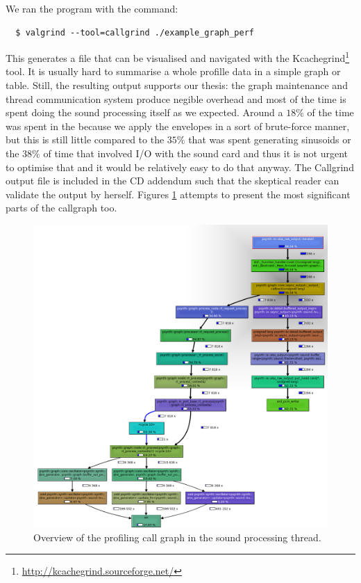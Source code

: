 We ran the program with the command:
\begin{verbatim}
  $ valgrind --tool=callgrind ./example_graph_perf
\end{verbatim}

This generates a  file that can be
visualised and navigated with the
Kcachegrind\footnote{\url{http://kcachegrind.sourceforge.net/}}
tool. It is usually hard to summarise a whole profille data in a
simple graph or table. Still, the resulting output supports our
thesis: the graph maintenance and thread communication system produce
negible overhead and most of the time is spent doing the sound
processing itself as we expected. Around a $18\%$ of the time was
spent in the  because we apply the envelopes
in a sort of brute-force manner, but this is still little compared to
the $35\%$ that was spent generating sinusoids or the $38\%$ of time
that involved I/O with the sound card and thus it is not urgent to
optimise that and it would be relatively easy to do that anyway. The
Callgrind output file is included in the CD addendum such that the
skeptical reader can validate the output by herself. Figures
\ref{fig:callgrind-1} attempts to present the most significant parts
of the callgraph too.

\begin{figure}[h!]
  \centering
  \includegraphics[width=\textwidth]{pic/callgrind1.png}
  \caption{Overview of the profiling call graph in the sound
    processing thread.}
  \label{fig:callgrind-1}
\end{figure}

